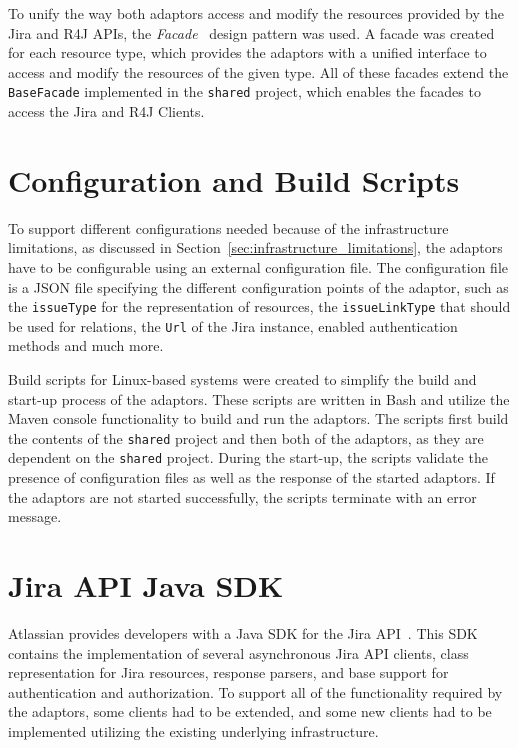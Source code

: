 To unify the way both adaptors access and modify the resources provided by the Jira and R4J APIs, the \emph{Facade} \cite{facade_design_pattern} design pattern was used. A facade was created for each resource type, which provides the adaptors with a unified interface to access and modify the resources of the given type. All of these facades extend the \texttt{BaseFacade} implemented in the \texttt{shared} project, which enables the facades to access the Jira and R4J Clients.

\section{Configuration and Build Scripts}
To support different configurations needed because of the infrastructure limitations, as discussed in Section \ref{sec:infrastructure_limitations}, the adaptors have to be configurable using an external configuration file. The configuration file is a JSON file specifying the different configuration points of the adaptor, such as the \texttt{issueType} for the representation of resources, the \texttt{issueLinkType} that should be used for relations, the \texttt{Url} of the Jira instance, enabled authentication methods and much more.

Build scripts for Linux-based systems were created to simplify the build and start-up process of the adaptors. These scripts are written in Bash and utilize the Maven console functionality to build and run the adaptors. The scripts first build the contents of the \texttt{shared} project and then both of the adaptors, as they are dependent on the \texttt{shared} project. During the start-up, the scripts validate the presence of configuration files as well as the response of the started adaptors. If the adaptors are not started successfully, the scripts terminate with an error message.

\section{Jira API Java SDK}
Atlassian provides developers with a Java SDK for the Jira API \cite{jira_java_sdk}. This SDK contains the implementation of several asynchronous Jira API clients, class representation for Jira resources, response parsers, and base support for authentication and authorization. To support all of the functionality required by the adaptors, some clients had to be extended, and some new clients had to be implemented utilizing the existing underlying infrastructure.

